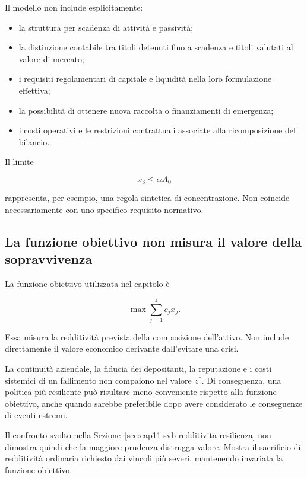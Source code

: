 Il modello non include esplicitamente:

\begin{itemize}

\item la struttura per scadenza di attivit\`a e passivit\`a;

\item la distinzione contabile tra titoli detenuti fino a scadenza e titoli
valutati al valore di mercato;

\item i requisiti regolamentari di capitale e liquidit\`a nella loro
formulazione effettiva;

\item la possibilit\`a di ottenere nuova raccolta o finanziamenti di
emergenza;

\item i costi operativi e le restrizioni contrattuali associate alla
ricomposizione del bilancio.

\end{itemize}

Il limite

\[
x_3\leq\alpha A_0
\]

\noindent rappresenta, per esempio, una regola sintetica di concentrazione. Non coincide
necessariamente con uno specifico requisito normativo.

\subsection{La funzione obiettivo non misura il valore della sopravvivenza}

La funzione obiettivo utilizzata nel capitolo \`e

\[
\max\sum_{j=1}^{4}c_jx_j.
\]

Essa misura la redditivit\`a prevista della composizione dell'attivo. Non
include direttamente il valore economico derivante dall'evitare una crisi.

La continuit\`a aziendale, la fiducia dei depositanti, la reputazione e i
costi sistemici di un fallimento non compaiono nel valore \(z^*\). Di
conseguenza, una politica pi\`u resiliente pu\`o risultare meno conveniente
rispetto alla funzione obiettivo, anche quando sarebbe preferibile dopo avere
considerato le conseguenze di eventi estremi.

Il confronto svolto nella Sezione~\ref{sec:cap11-svb-redditivita-resilienza}
non dimostra quindi che la maggiore prudenza distrugga valore. Mostra il
sacrificio di redditivit\`a ordinaria richiesto dai vincoli pi\`u severi,
mantenendo invariata la funzione obiettivo.

